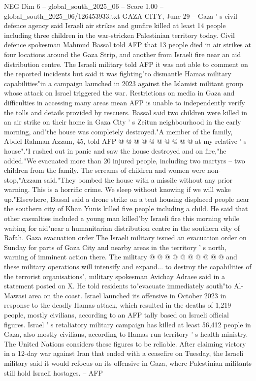 \begin{textsample}{NEG Dim 6 – global\_south\_2025\_06 – Score 1.00 – global\_south\_2025\_06/126453933.txt}  \label{ex:f6_neg_443}
GAZA CITY, June 29 -- Gaza ' s civil defence agency said Israeli air strikes and gunfire killed at least 14 people including three children in the war-stricken Palestinian territory today.
Civil defence spokesman Mahmud Bassal told AFP that 13 people died in air strikes at four locations around the Gaza Strip, and another from Israeli fire near an aid distribution centre.
The Israeli military told AFP it was not able to comment on the reported incidents but said it was fighting"to dismantle Hamas military capabilities"in a campaign launched in 2023 against the Islamist militant group whose attack on Israel triggered the war.
Restrictions on media in Gaza and difficulties in accessing many areas mean AFP is unable to independently verify the tolls and details provided by rescuers.
Bassal said two children were killed in an air strike on their home in Gaza City ' s Zeitun neighbourhood in the early morning, and"the house was completely destroyed."A member of the family, Abdel Rahman Azzam, 45, told AFP @ @ @ @ @ @ @ @ @ @ at my relative ' s house"."I rushed out in panic and saw the house destroyed and on fire,"he added."We evacuated more than 20 injured people, including two martyrs -- two children from the family.
The screams of children and women were non-stop,"Azzam said."They bombed the house with a missile without any prior warning.
This is a horrific crime.
We sleep without knowing if we will wake up."Elsewhere, Bassal said a drone strike on a tent housing displaced people near the southern city of Khan Yunis killed five people including a child.
He said that other casualties included a young man killed"by Israeli fire this morning while waiting for aid"near a humanitarian distribution centre in the southern city of Rafah.
Gaza evacuation order The Israeli military issued an evacuation order on Sunday for parts of Gaza City and nearby areas in the territory ' s north, warning of imminent action there.
The military @ @ @ @ @ @ @ @ @ @ and these military operations will intensify and expand... to destroy the capabilities of the terrorist organisations", military spokesman Avichay Adraee said in a statement posted on X.
He told residents to"evacuate immediately south"to Al-Mawasi area on the coast.
Israel launched its offensive in October 2023 in response to the deadly Hamas attack, which resulted in the deaths of 1,219 people, mostly civilians, according to an AFP tally based on Israeli official figures.
Israel ' s retaliatory military campaign has killed at least 56,412 people in Gaza, also mostly civilians, according to Hamas-run territory ' s health ministry.
The United Nations considers these figures to be reliable.
After claiming victory in a 12-day war against Iran that ended with a ceasefire on Tuesday, the Israeli military said it would refocus on its offensive in Gaza, where Palestinian militants still hold Israeli hostages. -- AFP

\end{textsample}
